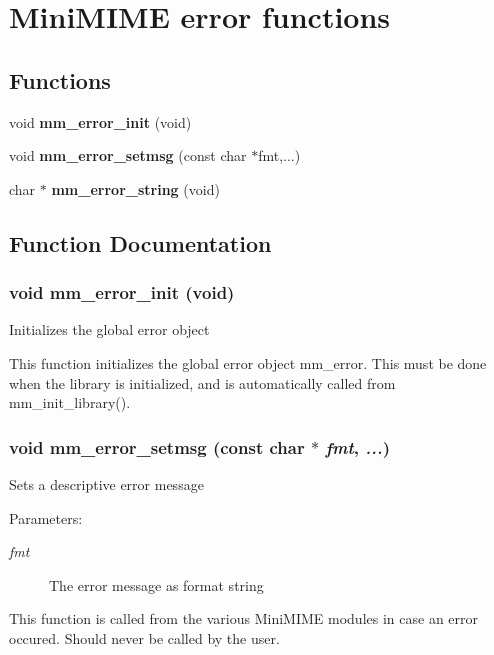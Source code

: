 \section{Mini\-MIME error functions}
\label{group__error}
\subsection*{Functions}
\begin{CompactItemize}
\item 
void {\bf mm\_\-error\_\-init} (void)
\item 
void {\bf mm\_\-error\_\-setmsg} (const char $\ast$fmt,...)
\item 
char $\ast$ {\bf mm\_\-error\_\-string} (void)
\end{CompactItemize}


\subsection{Function Documentation}
\subsubsection{\setlength{\rightskip}{0pt plus 5cm}void mm\_\-error\_\-init (void)}\label{group__error_g69de7c9bee1d535593a55807590de543}


Initializes the global error object

This function initializes the global error object mm\_\-error. This must be done when the library is initialized, and is automatically called from mm\_\-init\_\-library(). 
\subsubsection{\setlength{\rightskip}{0pt plus 5cm}void mm\_\-error\_\-setmsg (const char $\ast$ {\em fmt},  {\em ...})}\label{group__error_g92006c97728639d8f32f5bc4c6e2a47f}


Sets a descriptive error message

\begin{Desc}
\item[Parameters:]
\begin{description}
\item[{\em fmt}]The error message as format string\end{description}
\end{Desc}
This function is called from the various Mini\-MIME modules in case an error occured. Should never be called by the user. 
